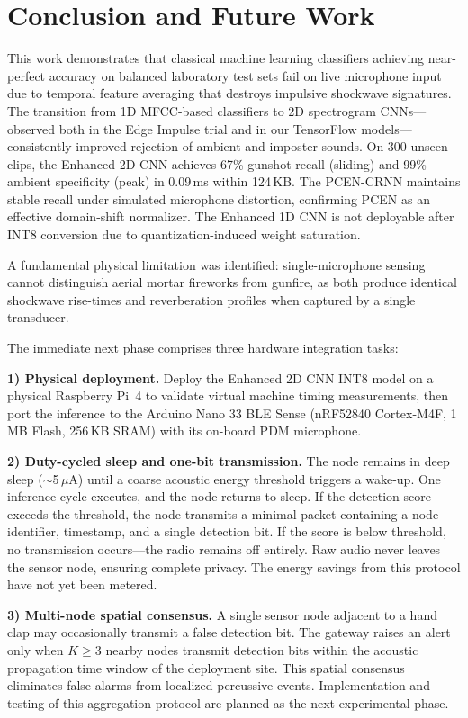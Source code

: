 \documentclass[conference]{IEEEtran}
\begin{document}
\section{Conclusion and Future Work}
\label{sec:conclusion}

This work demonstrates that classical machine learning classifiers achieving near-perfect accuracy on balanced laboratory test sets fail on live microphone input due to temporal feature averaging that destroys impulsive shockwave signatures. The transition from 1D MFCC-based classifiers to 2D spectrogram CNNs---observed both in the Edge Impulse trial and in our TensorFlow models---consistently improved rejection of ambient and imposter sounds. On 300 unseen clips, the Enhanced 2D CNN achieves 67\% gunshot recall (sliding) and 99\% ambient specificity (peak) in 0.09\,ms within 124\,KB. The PCEN-CRNN maintains stable recall under simulated microphone distortion, confirming PCEN as an effective domain-shift normalizer. The Enhanced 1D CNN is not deployable after INT8 conversion due to quantization-induced weight saturation.

A fundamental physical limitation was identified: single-microphone sensing cannot distinguish aerial mortar fireworks from gunfire, as both produce identical shockwave rise-times and reverberation profiles when captured by a single transducer.

The immediate next phase comprises three hardware integration tasks:

\textbf{1) Physical deployment.} Deploy the Enhanced 2D CNN INT8 model on a physical Raspberry Pi~4 to validate virtual machine timing measurements, then port the inference to the Arduino Nano 33 BLE Sense (nRF52840 Cortex-M4F, 1\,MB Flash, 256\,KB SRAM) with its on-board PDM microphone.

\textbf{2) Duty-cycled sleep and one-bit transmission.} The node remains in deep sleep ($\sim$5\,$\mu$A) until a coarse acoustic energy threshold triggers a wake-up. One inference cycle executes, and the node returns to sleep. If the detection score exceeds the threshold, the node transmits a minimal packet containing a node identifier, timestamp, and a single detection bit. If the score is below threshold, no transmission occurs---the radio remains off entirely. Raw audio never leaves the sensor node, ensuring complete privacy. The energy savings from this protocol have not yet been metered.

\textbf{3) Multi-node spatial consensus.} A single sensor node adjacent to a hand clap may occasionally transmit a false detection bit. The gateway raises an alert only when $K \ge 3$ nearby nodes transmit detection bits within the acoustic propagation time window of the deployment site. This spatial consensus eliminates false alarms from localized percussive events. Implementation and testing of this aggregation protocol are planned as the next experimental phase.
\end{document}
